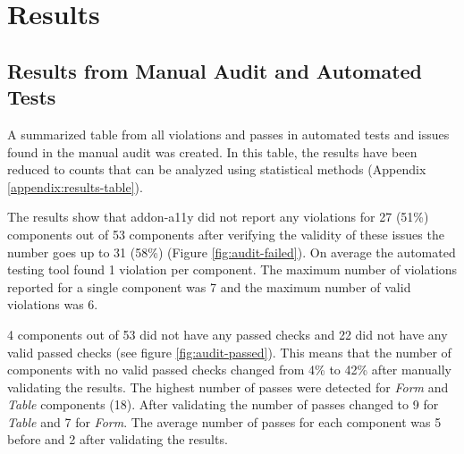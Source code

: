 \documentclass{master_thesis}
\begin{document}
\section{Results}

\subsection{Results from Manual Audit and Automated Tests}


A summarized table from all violations and passes in automated tests and issues found in the manual audit was created. In this table, the results have been reduced to counts that can be analyzed using statistical methods (Appendix \ref{appendix:results-table}).

The results show that addon-a11y did not report any violations for 27 (51\%) components out of 53 components after verifying the validity of these issues the number goes up to 31 (58\%) (Figure \ref{fig:audit-failed}). On average the automated testing tool found 1 violation per component. The maximum number of violations reported for a single component was 7 and the maximum number of valid violations was 6.

4 components out of 53 did not have any passed checks and 22 did not have any valid passed checks (see figure \ref{fig:audit-passed}). This means that the number of components with no valid passed checks changed from 4\%  to 42\% after manually validating the results. The highest number of passes were detected for \textit{Form} and \textit{Table} components (18). After validating the number of passes changed to 9 for \textit{Table} and 7 for \textit{Form}. The average number of passes for each component was 5 before and 2 after validating the results.
\end{document}
